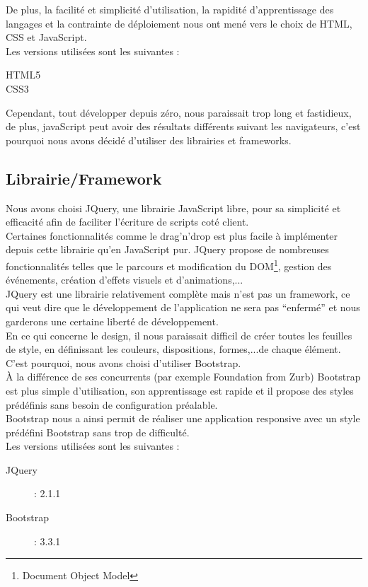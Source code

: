 \documentclass{sigplanconf}
\begin{document}
De plus, la facilité et simplicité d'utilisation, la rapidité d'apprentissage des langages et la contrainte de déploiement nous ont mené vers le choix de HTML, CSS et JavaScript.\\
Les versions utilisées sont les suivantes :
\begin{description}
\item [HTML5]
\item [CSS3]
\end{description}

Cependant, tout développer depuis zéro, nous paraissait trop long et fastidieux, de plus, javaScript peut avoir des résultats différents suivant les navigateurs, c'est pourquoi nous avons décidé d'utiliser des librairies et frameworks.

\subsection{Librairie/Framework}
Nous avons choisi JQuery\cite{urljQuery}, une librairie JavaScript libre, pour sa simplicité et efficacité afin de faciliter l'écriture de scripts coté client.\\
Certaines fonctionnalités comme le drag’n’drop est plus facile à implémenter depuis cette librairie qu’en JavaScript pur. JQuery propose de nombreuses fonctionnalités telles que le parcours et modification du DOM\footnote{Document Object Model}, gestion des événements, création d'effets visuels et d'animations,...\\
JQuery est une librairie relativement complète mais n'est pas un framework, ce qui veut dire que le développement de l'application ne sera pas ``enfermé'' et nous garderons une certaine liberté de développement.\\

En ce qui concerne le design, il nous paraissait difficil de créer toutes les feuilles de style, en définissant les couleurs, dispositions, formes,...de chaque élément. C'est pourquoi, nous avons choisi d’utiliser Bootstrap\cite{urlBootstrap}.\\
À la différence de ses concurrents (par exemple Foundation from Zurb) Bootstrap est plus simple d’utilisation, son apprentissage est rapide et il propose des styles prédéfinis sans besoin de configuration préalable.\\
Bootstrap nous a ainsi permit de réaliser une application responsive avec un style prédéfini Bootstrap sans trop de difficulté.\\
Les versions utilisées sont les suivantes :
\begin{description}
\item [JQuery] : 2.1.1
\item [Bootstrap] : 3.3.1
\end{description}
\end{document}
